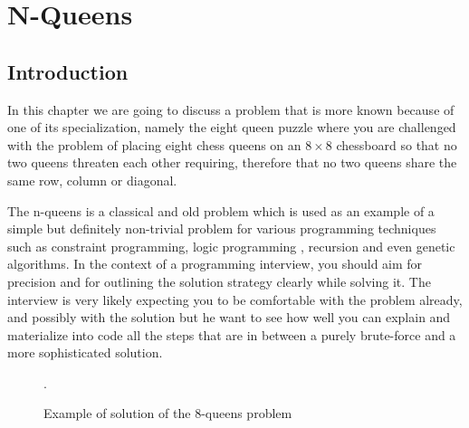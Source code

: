 %



\chapter{N-Queens}
\label{ch:nqueens}
\section*{Introduction}
In this chapter we are going to discuss a problem that is more known because of one of its
specialization, namely the eight queen puzzle where you are challenged with the problem of placing
eight chess queens on an $8 \times 8$ chessboard so that no two queens threaten each other
requiring, therefore that no two queens share the same row, column or diagonal.

The n-queens is a classical and old problem which is used as an example of a simple but definitely
non-trivial problem for various programming techniques such as constraint programming, logic
programming , recursion and even genetic algorithms. In the context of a programming interview, you
should aim for precision and for outlining the solution strategy clearly while solving it. The
interview is very likely expecting you to be comfortable with the problem already, and possibly with
the solution but he want to see how well you can explain and materialize into code all the steps
that are in between a purely brute-force and a more sophisticated solution.

\begin{figure}
	 \centering 
	 \newgame
	 \def\myfen{4q3/6q1/3q4/q7/2q5/7q/5q2/1q6 w - - 0 1}
	 \chessboard[showmover=false,setfen=\myfen]
	 \caption{Example of solution of the $8$-queens problem}.
	  \label{fig:nqueens:chessboard}
\end{figure}


